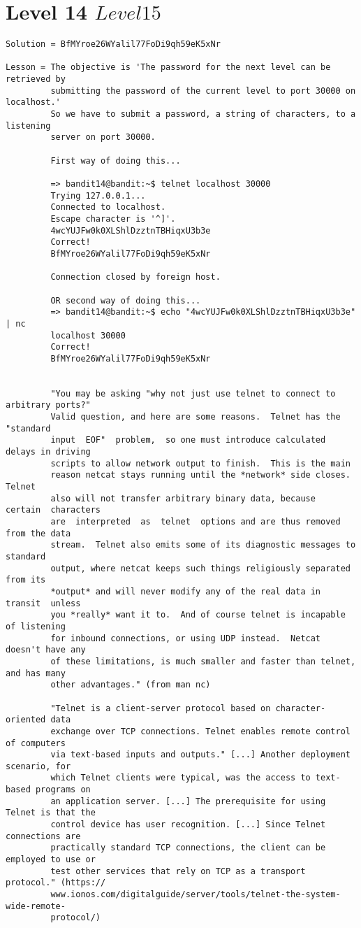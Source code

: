 \documentclass[a4paper]{report}
\begin{document}
\section{Level 14 \rightarrow $ Level 15 $}

\begin{verbatim}
Solution = BfMYroe26WYalil77FoDi9qh59eK5xNr

Lesson = The objective is 'The password for the next level can be retrieved by
		 submitting the password of the current level to port 30000 on localhost.'
		 So we have to submit a password, a string of characters, to a listening
		 server on port 30000.

		 First way of doing this...

		 => bandit14@bandit:~$ telnet localhost 30000
		 Trying 127.0.0.1...
		 Connected to localhost.
		 Escape character is '^]'.
		 4wcYUJFw0k0XLShlDzztnTBHiqxU3b3e
		 Correct!
		 BfMYroe26WYalil77FoDi9qh59eK5xNr

		 Connection closed by foreign host.

		 OR second way of doing this...
		 => bandit14@bandit:~$ echo "4wcYUJFw0k0XLShlDzztnTBHiqxU3b3e" | nc
		 localhost 30000
		 Correct!
		 BfMYroe26WYalil77FoDi9qh59eK5xNr


		 "You may be asking "why not just use telnet to connect to arbitrary ports?" 
		 Valid question, and here are some reasons.  Telnet has the "standard  
		 input  EOF"  problem,  so one must introduce calculated delays in driving 
		 scripts to allow network output to finish.  This is the main
		 reason netcat stays running until the *network* side closes.  Telnet 
		 also will not transfer arbitrary binary data, because  certain  characters  
		 are  interpreted  as  telnet  options and are thus removed from the data 
		 stream.  Telnet also emits some of its diagnostic messages to standard 
		 output, where netcat keeps such things religiously separated from its 
		 *output* and will never modify any of the real data in  transit  unless  
		 you *really* want it to.  And of course telnet is incapable of listening 
		 for inbound connections, or using UDP instead.  Netcat doesn't have any 
		 of these limitations, is much smaller and faster than telnet, and has many 
		 other advantages." (from man nc)
		 
		 "Telnet is a client-server protocol based on character-oriented data
		 exchange over TCP connections. Telnet enables remote control of computers 
		 via text-based inputs and outputs." [...] Another deployment scenario, for 
		 which Telnet clients were typical, was the access to text-based programs on 
		 an application server. [...] The prerequisite for using Telnet is that the 
		 control device has user recognition. [...] Since Telnet connections are 
		 practically standard TCP connections, the client can be employed to use or 
		 test other services that rely on TCP as a transport protocol." (https://
		 www.ionos.com/digitalguide/server/tools/telnet-the-system-wide-remote-
		 protocol/)
		 

\end{verbatim}
\end{document}
